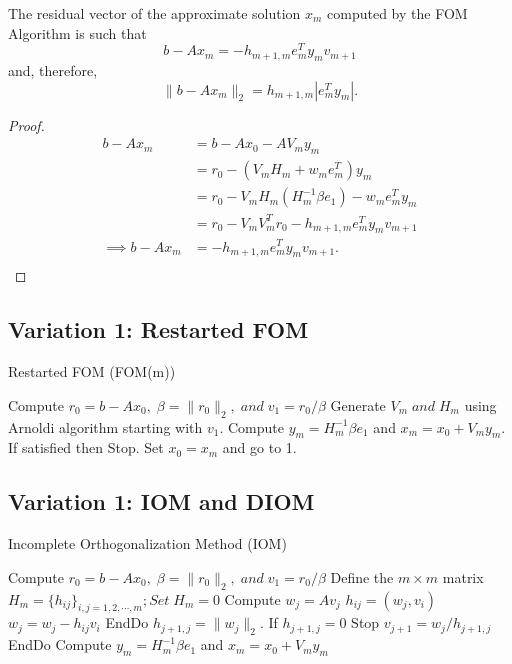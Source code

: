 \documentclass[10pt,a4paper]{article}
\begin{document}
\begin{prop}
The residual vector of the approximate solution $x_m$ computed by the FOM Algorithm is such that 
$$b-Ax_m=-h_{m+1,m}e^T_my_mv_{m+1}$$
and, therefore,
$$\|b-Ax_m\|_2=h_{m+1,m}|e^T_my_m|.$$

\begin{proof}
\begin{align*}
b-Ax_m &= b-Ax_0-AV_my_m \\
&= r_0 - (V_mH_m+w_me^T_m)y_m \\
&= r_0 - V_mH_m(H^{-1}_m\beta e_1) - w_me^T_my_m \\
&= r_0 - V_mV^T_mr_0 - h_{m+1,m}e^T_my_mv_{m+1} \\
\implies b-Ax_m&=-h_{m+1,m}e^T_my_mv_{m+1}. \\
\end{align*}
\end{proof}
\end{prop}

\subsection{Variation 1: Restarted FOM}

\begin{algorithm}
\caption{Restarted FOM (FOM(m))}
\begin{algorithmic}[1]
\State Compute $r_0=b-Ax_0,\;\beta=\|r_0\|_2,\;and\;v_1=r_0/\beta$
\State Generate $V_m\;and\;H_m$ using Arnoldi algorithm starting with $v_1$.
\State Compute $y_m=H^{-1}_m\beta e_1$ and $x_m=x_0+V_my_m$. If satisfied then Stop.
\State Set $x_0=x_m$ and go to 1.
\end{algorithmic}
\end{algorithm}

\subsection{Variation 1: IOM and DIOM}

\begin{algorithm}
\caption{Incomplete Orthogonalization Method (IOM)}
\begin{algorithmic}[1]
\State Compute $r_0=b-Ax_0,\;\beta=\|r_0\|_2,\;and\;v_1=r_0/\beta$
\State Define the $m\times m$ matrix $H_m = \{h_{ij}\}_{i,j=1,2,\cdots,m};Set\;H_m=0$
	\State Compute $w_j = Av_j$
		\State $h_{ij} = (w_j,v_i)$
		\State $w_j = w_j - h_{ij}v_i$
	\EndFor
	\State EndDo
	\State $h_{j+1,j} = \|w_j\|_2$. If $h_{j+1,j}=0$ Stop
	\State $v_{j+1}=w_j/h_{j+1,j}$
\EndFor
\State EndDo
\State Compute $y_m=H^{-1}_m\beta e_1$ and $x_m=x_0+V_my_m$
\end{algorithmic}
\end{algorithm}
\end{document}
